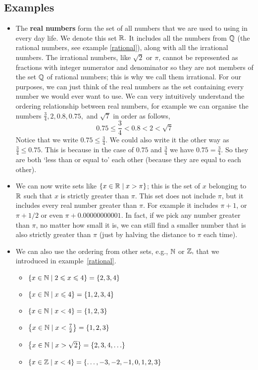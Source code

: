 \subsection{Examples} \label{dot}
\begin{itemize}
\item
The \textbf{real numbers} \label{real numbers} form the set of all numbers that we are used to using in every day life. We denote this set $\mathbb{R}.$ \label{symbR} It includes all the numbers from $\mathbb{Q}$ (the rational numbers, see example \ref{rational}), along with all the irrational numbers. The irrational numbers, \label{irrational numbers} like $\sqrt{2}$ or $\pi$, cannot be represented as fractions with integer numerator and denominator so they are not members of the set $\mathbb{Q}$ of rational numbers; this is why we call them irrational. For our purposes, we can just think of the real numbers as the set containing every number we would ever want to use. We can very intuitively understand the ordering relationship between real numbers, for example we can organise the numbers $\frac{3}{4}, 2, 0.8, 0.75,$ and $\sqrt{7}$ in order as follows,
\[
0.75 \leq \frac{3}{4} < 0.8 < 2 < \sqrt{7}
\]
Notice that we write $0.75 \leq \frac{3}{4}$. We could also write it the other way as $\frac{3}{4} \leq 0.75$. This is because in the case of $0.75$ and $\frac{3}{4}$ we have $0.75 = \frac{3}{4}$. So they are both `less than or equal to' each other (because they are equal to each other).
\item
We can now write sets like $\left\{x \in \mathbb{R} \mid x > \pi\right\}$; this is the set of $x$ belonging to $\mathbb{R}$ such that $x$ is strictly greater than $\pi.$ This set does not include $\pi$, but it includes every real number greater than $\pi$. For example it includes $\pi + 1$, or $\pi + 1/2$ or even $\pi + 0.00000000001$. In fact, if we pick any number greater than $\pi$, no matter how small it is, we can still find a smaller number that is also strictly greater than $\pi$ (just by halving the distance to $\pi$ each time). 
\item
We can also use the ordering from other sets, e.g., $\mathbb{N}$ or $\mathbb{Z},$ that we introduced in example~\ref{rational}.
\begin{itemize}
\item
$\left\{x \in \mathbb{N} \mid 2 \leqslant x \leqslant 4\right\} = \left\{2,3,4\right\}$
\item
 $\left\{x \in \mathbb{N} \mid x \leqslant 4\right\} = \left\{1,2,3,4\right\}$
\item
 $\left\{x \in \mathbb{N} \mid x < 4\right\} = \left\{1,2,3\right\}$
\item
 $\left\{x \in \mathbb{N} \mid x < \frac{7}{2}\right\} = \left\{1,2,3\right\}$
\item
 $\left\{x \in \mathbb{N} \mid x > \sqrt{2}\right\} = \left\{2,3,4,\ldots\right\}$
\item
 $\left\{x \in \mathbb{Z} \mid x < 4\right\} = \left\{\ldots,-3,-2,-1,0,1,2,3\right\}$ 
\end{itemize}
\end{itemize}

